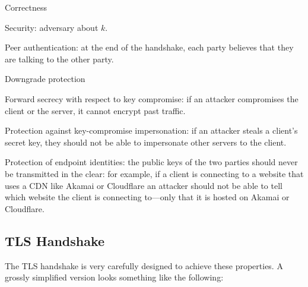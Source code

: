 \begin{compactitem}
	\item Correctness
	\item Security: adversary  about $k$.
	\item Peer authentication: at the end of the handshake, each party believes that they are talking to the other party.
	\item Downgrade protection
	\item Forward secrecy with respect to key compromise: if an attacker compromises the client or the server, it cannot encrypt past traffic. 
	\item Protection against key-compromise impersonation: if an attacker steals a client's secret key, they should not be able to impersonate other servers to the client.
	\item Protection of endpoint identities: the public keys of the two parties should never be transmitted in the clear: for example, if a client is connecting to a website that uses a CDN like Akamai or Cloudflare an attacker should not be able to tell which website the client is connecting to---only that it is hosted on Akamai or Cloudflare.
\end{compactitem}

\subsection{TLS Handshake}
The TLS handshake is very carefully designed to achieve these properties. A grossly simplified version looks something like the following:

